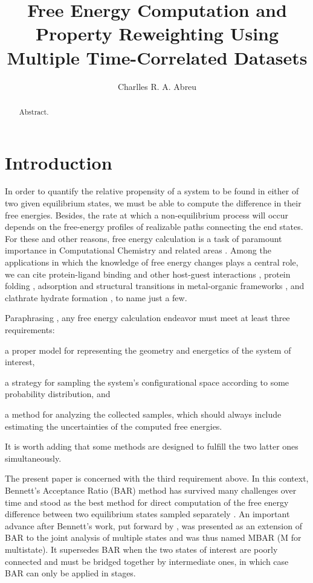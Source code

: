 \documentclass[journal=jctcce,manuscript=article,layout=twocolumn]{achemso}
\author{Charlles R. A. Abreu}
\affiliation{Chemical Engineering Department, Escola de Quimica, Universidade Federal do Rio de Janeiro, Rio de Janeiro, RJ 21941-909, Brazil}
\title{Free Energy Computation and Property Reweighting Using Multiple Time-Correlated Datasets}
\begin{document}

\begin{abstract}
Abstract.
\end{abstract}

\section{Introduction}
\label{sec:introduction}

In order to quantify the relative propensity of a system to be found in either of two given equilibrium states, we must be able to compute the difference in their free energies. Besides, the rate at which a non-equilibrium process will occur depends on the free-energy profiles of realizable paths connecting the end states. For these and other reasons, free energy calculation is a task of paramount importance in Computational Chemistry and related areas \cite{Chipot_2007, Christ_2010, Hansen_2014}. Among the applications in which the knowledge of free energy changes plays a central role, we can cite protein-ligand binding \cite{Chodera_2011, Abel_2017, Abel_2017_2, Cournia_2017} and other host-guest interactions \cite{X}, protein folding \cite{Perez_2016, X}, adsorption and structural transitions in metal-organic frameworks \cite{Coudert_2008, Bousquet_2012, Ghysels_2013, Demuynck_2017}, and clathrate hydrate formation \cite{X}, to name just a few.

Paraphrasing \citeauthor{Christ_2010} \cite{Christ_2010}, any free energy calculation endeavor must meet at least three requirements: \begin{enumerate*}[label=\arabic*)] \item a proper model for representing the geometry and energetics of the system of interest, \item a strategy for sampling the system's configurational space according to some probability distribution, and \item a method for analyzing the collected samples, which should always include estimating the uncertainties of the computed free energies.\end{enumerate*} It is worth adding that some methods are designed to fulfill the two latter ones simultaneously.

The present paper is concerned with the third requirement above. In this context, Bennett's Acceptance Ratio (BAR) method \cite{Bennett_1976} has survived many challenges over time and stood as the best method for direct computation of the free energy difference between two equilibrium states sampled separately \cite{Lu_2003, Shirts_2005}. An important advance after Bennett's work, put forward by \citeauthor{Shirts_2008} \cite{Shirts_2008}, was presented as an extension of BAR to the joint analysis of multiple states and was thus named MBAR (M for multistate). It supersedes BAR when the two states of interest are poorly connected and must be bridged together by intermediate ones, in which case BAR can only be applied in stages.
\end{document}
